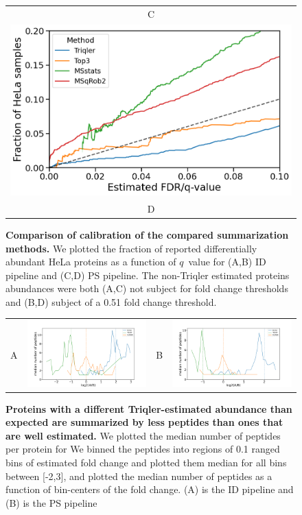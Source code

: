 \documentclass[11pt]{article}
\begin{document}
\begin{figure}[hbt]
\begin{tabular}{c}
        C \\
        \includegraphics[width=0.5\linewidth]{../../result/report_plots_pipeline/calibration_PS_0.51.png} \\
        D 
    \end{tabular}
  \caption{{\bf Comparison of calibration of the compared summarization methods.} We plotted the fraction of reported differentially abundant HeLa proteins as a function of $q$~value for (A,B) ID pipeline and (C,D) PS pipeline. The non-Triqler  estimated proteins abundances were both (A,C) not subject for fold change thresholds and (B,D) subject of a 0.51 fold change threshold. \label{fig:frac_hela_vs_fdr}}
\end{figure}


\begin{figure}[hbt]
    \centering
    \centering
    \begin{tabular}{lclc} 
        A & \includegraphics[width=0.5\linewidth]{../../result/report_plots_pipeline/fc_peptide_count_ID_triqler.png} &
        B & \includegraphics[width=0.5\linewidth]{../../result/report_plots_pipeline/fc_peptide_count_PS_triqler.png} \\
    \end{tabular}
    \caption{{\bf Proteins with a different Triqler-estimated abundance than expected are summarized by less peptides than ones that are well estimated.} We plotted the median number of peptides per protein for    
  We binned the peptides into regions of 0.1 ranged bins of estimated fold change and plotted them median for all bins between [-2,3], and plotted the median number of peptides as a function of bin-centers of the fold change. (A) is the ID pipeline and (B) is the PS pipeline \label{fig:number_of_peptides_supplement}}
\end{figure}
\end{document}

